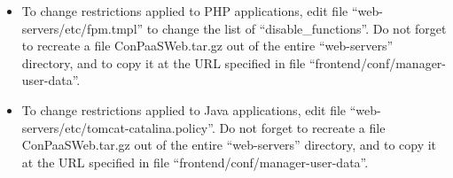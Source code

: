 \documentclass[12pt]{article}
\begin{document}
\begin{itemize}
\item To change restrictions applied to PHP applications, edit file
  ``web-servers/etc/fpm.tmpl'' to change the list of
  ``disable\_functions''. Do not forget to recreate a file
  ConPaaSWeb.tar.gz out of the entire ``web-servers'' directory, and
  to copy it at the URL specified in file
  ``frontend/conf/manager-user-data''.
\item To change restrictions applied to Java applications, edit file
  ``web-servers/etc/tomcat-catalina.policy''. Do not forget to
  recreate a file ConPaaSWeb.tar.gz out of the entire ``web-servers''
  directory, and to copy it at the URL specified in file
  ``frontend/conf/manager-user-data''.
\end{itemize}
\end{document}
